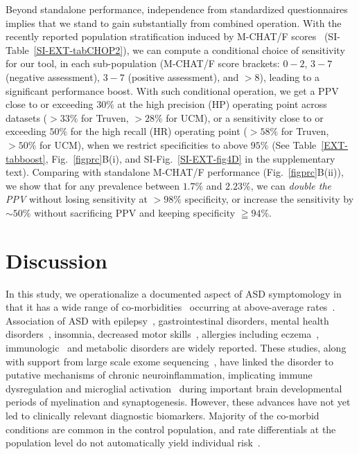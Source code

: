 \documentclass[onecolumn,,10pt]{IEEEtran}
\begin{document}
Beyond standalone performance, independence from standardized questionnaires implies that we stand to gain substantially  from combined operation. With the recently reported population stratification induced by M-CHAT/F scores~\cite{pmid31562252} (SI-Table~\ref{SI-EXT-tabCHOP2}), we can compute a conditional choice of sensitivity  for our tool, in each sub-population (M-CHAT/F score brackets: $0-2$, $3-7$ (negative assessment), $3-7$ (positive assessment), and $>8$), leading to a  significant performance boost. With such conditional operation, we get a PPV close to or exceeding $30\%$ at the high precision (HP) operating point across datasets ($>33\%$ for Truven, $>28\%$ for UCM), or a sensitivity close to or exceeding $50\%$ for the high recall (HR) operating point ($>58\%$ for  Truven, $>50\%$ for UCM), when we restrict specificities to above $95\%$ (See Table~\ref{EXT-tabboost}, Fig.~\ref{figprc}B(i), and SI-Fig.~\ref{SI-EXT-fig4D}  in the supplementary text). Comparing   with standalone M-CHAT/F performance (Fig.~\ref{figprc}B(ii)), we show that for any prevalence between $1.7\%$ and $2.23\%$, we can   \textit{double the PPV} without losing sensitivity at $>98\%$ specificity, or increase the sensitivity by $\sim 50\%$ without sacrificing PPV and  keeping specificity $\geqq 94\%$.%

\section*{Discussion}
In this study, we operationalize a documented aspect of ASD symptomology in  that it has   a wide range  of co-morbidities~\cite{pmid22511918,pmid30733689,pmid25681541} occurring at above-average  rates~\cite{hyman2020identification}. Association of ASD  with epilepsy~\cite{pmid23935565}, gastrointestinal disorders\cite{pmid30646068,pmid21651783,pmid30823414,pmid21282636,pmid29028817,pmid30109601}, mental health disorders~\cite{pmid24729779}, insomnia, decreased motor skills~\cite{pmid30337860}, allergies including eczema~\cite{pmid30646068,pmid21651783,pmid30823414,pmid21282636,pmid29028817,pmid30109601}, immunologic~\cite{pmid30971960,pmid30941018,pmid29691724,pmid29307081,pmid27351598,pmid26793298,pmid30095240,pmid25681541} and metabolic\cite{pmid30178105,pmid27957319,pmid29028817} disorders are  widely reported. These studies, along with support from large scale exome sequencing~\cite{Satterstrom484113,pmid25038753}, have linked the disorder to putative mechanisms of  chronic neuroinflammation,  implicating immune dysregulation and microglial activation~\cite{pmid15546155,pmid21595886,pmid21629840,pmid26793298,pmid30483058,pmid29691724} during important brain developmental periods  of  myelination and synaptogenesis. However, these advances have not yet led  to   clinically relevant diagnostic biomarkers.  Majority of the co-morbid conditions are common in the control population, and  rate differentials at the population level do not automatically yield individual risk~\cite{Pearce2000}.
\end{document}
